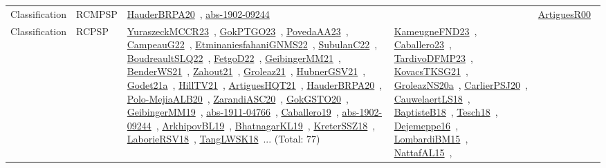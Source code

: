 {\begin{longtable}{lp{3cm}>{\raggedright\arraybackslash}p{6cm}>{\raggedright\arraybackslash}p{6cm}>{\raggedright\arraybackslash}p{8cm}}
\index{RCMPSP}\index{Classification!RCMPSP}Classification & RCMPSP & \href{../works/HauderBRPA20.pdf}{HauderBRPA20}~\cite{HauderBRPA20}, \href{../works/abs-1902-09244.pdf}{abs-1902-09244}~\cite{abs-1902-09244} &  & \href{../works/ArtiguesR00.pdf}{ArtiguesR00}~\cite{ArtiguesR00}\\
\index{RCPSP}\index{Classification!RCPSP}Classification & RCPSP & \href{../works/YuraszeckMCCR23.pdf}{YuraszeckMCCR23}~\cite{YuraszeckMCCR23}, \href{../works/GokPTGO23.pdf}{GokPTGO23}~\cite{GokPTGO23}, \href{../works/PovedaAA23.pdf}{PovedaAA23}~\cite{PovedaAA23}, \href{../works/CampeauG22.pdf}{CampeauG22}~\cite{CampeauG22}, \href{../works/EtminaniesfahaniGNMS22.pdf}{EtminaniesfahaniGNMS22}~\cite{EtminaniesfahaniGNMS22}, \href{../works/SubulanC22.pdf}{SubulanC22}~\cite{SubulanC22}, \href{../works/BoudreaultSLQ22.pdf}{BoudreaultSLQ22}~\cite{BoudreaultSLQ22}, \href{../works/FetgoD22.pdf}{FetgoD22}~\cite{FetgoD22}, \href{../works/GeibingerMM21.pdf}{GeibingerMM21}~\cite{GeibingerMM21}, \href{../works/BenderWS21.pdf}{BenderWS21}~\cite{BenderWS21}, \href{../works/Zahout21.pdf}{Zahout21}~\cite{Zahout21}, \href{../works/Groleaz21.pdf}{Groleaz21}~\cite{Groleaz21}, \href{../works/HubnerGSV21.pdf}{HubnerGSV21}~\cite{HubnerGSV21}, \href{../works/Godet21a.pdf}{Godet21a}~\cite{Godet21a}, \href{../works/HillTV21.pdf}{HillTV21}~\cite{HillTV21}, \href{../works/ArtiguesHQT21.pdf}{ArtiguesHQT21}~\cite{ArtiguesHQT21}, \href{../works/HauderBRPA20.pdf}{HauderBRPA20}~\cite{HauderBRPA20}, \href{../works/Polo-MejiaALB20.pdf}{Polo-MejiaALB20}~\cite{Polo-MejiaALB20}, \href{../works/ZarandiASC20.pdf}{ZarandiASC20}~\cite{ZarandiASC20}, \href{../works/GokGSTO20.pdf}{GokGSTO20}~\cite{GokGSTO20}, \href{../works/GeibingerMM19.pdf}{GeibingerMM19}~\cite{GeibingerMM19}, \href{../works/abs-1911-04766.pdf}{abs-1911-04766}~\cite{abs-1911-04766}, \href{../works/Caballero19.pdf}{Caballero19}~\cite{Caballero19}, \href{../works/abs-1902-09244.pdf}{abs-1902-09244}~\cite{abs-1902-09244}, \href{../works/ArkhipovBL19.pdf}{ArkhipovBL19}~\cite{ArkhipovBL19}, \href{../works/BhatnagarKL19.pdf}{BhatnagarKL19}~\cite{BhatnagarKL19}, \href{../works/KreterSSZ18.pdf}{KreterSSZ18}~\cite{KreterSSZ18}, \href{../works/LaborieRSV18.pdf}{LaborieRSV18}~\cite{LaborieRSV18}, \href{../works/TangLWSK18.pdf}{TangLWSK18}~\cite{TangLWSK18}... (Total: 77) & \href{../works/KameugneFND23.pdf}{KameugneFND23}~\cite{KameugneFND23}, \href{../works/Caballero23.pdf}{Caballero23}~\cite{Caballero23}, \href{../works/TardivoDFMP23.pdf}{TardivoDFMP23}~\cite{TardivoDFMP23}, \href{../works/KovacsTKSG21.pdf}{KovacsTKSG21}~\cite{KovacsTKSG21}, \href{../works/GroleazNS20a.pdf}{GroleazNS20a}~\cite{GroleazNS20a}, \href{../works/CarlierPSJ20.pdf}{CarlierPSJ20}~\cite{CarlierPSJ20}, \href{../works/CauwelaertLS18.pdf}{CauwelaertLS18}~\cite{CauwelaertLS18}, \href{../works/BaptisteB18.pdf}{BaptisteB18}~\cite{BaptisteB18}, \href{../works/Tesch18.pdf}{Tesch18}~\cite{Tesch18}, \href{../works/Dejemeppe16.pdf}{Dejemeppe16}~\cite{Dejemeppe16}, \href{../works/LombardiBM15.pdf}{LombardiBM15}~\cite{LombardiBM15}, \href{../works/NattafAL15.pdf}{NattafAL15}~\cite{NattafAL15}, 
\end{longtable}}
